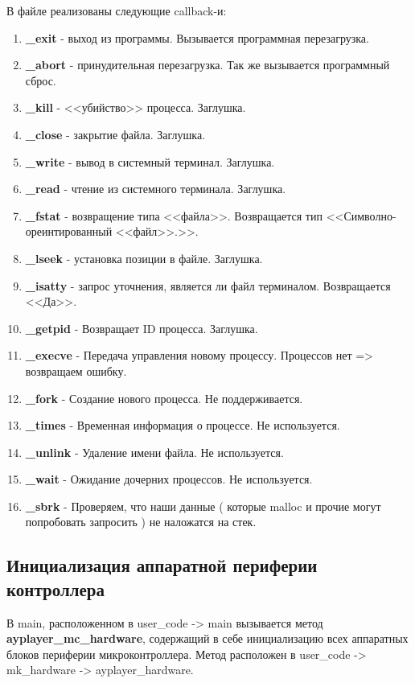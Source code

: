 \documentclass[a4paper, 12pt]{article}
\begin{document}
В файле реализованы следующие callback-и:
\begin{enumerate}
	\item \textbf{\_exit} - выход из программы. Вызывается программная перезагрузка.
	\item \textbf{\_abort} - принудительная перезагрузка. Так же вызывается программный сброс.
	\item \textbf{\_kill} - <<убийство>> процесса. Заглушка.
	\item \textbf{\_close} - закрытие файла. Заглушка.
	\item \textbf{\_write} - вывод в системный терминал. Заглушка.
	\item \textbf{\_read} - чтение из системного терминала. Заглушка.
	\item \textbf{\_fstat} - возвращение типа <<файла>>. Возвращается тип <<Символно-ореинтированный <<файл>>.>>.
	\item \textbf{\_lseek} - установка позиции в файле. Заглушка.
	\item \textbf{\_isatty} - запрос уточнения, является ли файл терминалом. Возвращается <<Да>>.
	\item \textbf{\_getpid} - Возвращает ID процесса. Заглушка.
	\item \textbf{\_execve} - Передача управления новому процессу. Процессов нет => возвращаем ошибку.
	\item \textbf{\_fork} - Создание нового процесса. Не поддерживается.
	\item \textbf{\_times} - Временная информация о процессе. Не используется.
	\item \textbf{\_unlink} - Удаление имени файла. Не используется.
	\item \textbf{\_wait} - Ожидание дочерних процессов. Не используется.
	\item \textbf{\_sbrk} - Проверяем, что наши данные ( которые malloc и прочие могут попробовать запросить ) не наложатся на стек.
\end{enumerate}

\subsection{Инициализация аппаратной периферии контроллера}
В main, расположенном в user\_code -> main вызывается метод \textbf{ayplayer\_mc\_hardware}, содержащий в себе инициализацию всех аппаратных блоков периферии микроконтроллера. Метод расположен в user\_code -> mk\_hardware -> ayplayer\_hardware.
\end{document}
